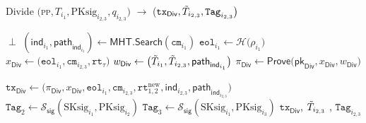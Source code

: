 \begin{algorithm}
\caption{\textsf{Divide} $\big($\textsc{pp}$, T_{i_1},  \text{PKsig}_{i_{2,3}}, q_{i_{2,3}} \big)$ $\rightarrow$ \big($\texttt{tx}_{\textsf{Div}}, \Tilde{T}_{i_{2,3}}, \texttt{Tag}_{i_{2,3}}\big)$}\label{alg:divide}
\begin{algorithmic}[1]
\State \Return $\perp$
\EndIf
\State $(\mathsf{ind}_{i_1}, \mathsf{path}_{\mathsf{ind}_{i_1}}) \gets \mathsf{MHT}.\mathsf{Search}(\texttt{cm}_{i_1})$
\State $\texttt{eol}_{i_1} \gets \mathcal{H} \big( \rho_{i_1}\big)$
\State $x_\textsf{Div} \gets \big(\texttt{eol}_{i_1}, \texttt{cm}_{i_{2,3}}, \texttt{rt}_\tau \big)$
\State $w_\textsf{Div} \gets \big( \Tilde{T}_{i_1}, \Tilde{T}_{i_{2,3}}, \mathsf{path}_{\mathsf{ind}_{i_1}}\big)$
\State $\pi_{\textsf{Div}} \gets \textsf{Prove}\big(\mathsf{pk}_{\textsf{Div}}, x_{\textsf{Div}}, w_{\textsf{Div}}\big)$

\State$\texttt{tx}_{\textsf{Div}} \gets \big(\pi_{\textsf{Div}}, x_{\textsf{Div}}, \texttt{eol}_{i_1}, \texttt{cm}_{i_{2,3}}, \texttt{rt}_{1,2}^{\text{new}}, \mathsf{ind}_{i_{2,3}}, \mathsf{path}_{\mathsf{ind}_{i_{2,3}}} \big)$
\State $\texttt{Tag}_2 \leftarrow \mathcal{S}_\mathsf{sig}(\text{SKsig}_{i_1}, \text{PKsig}_{i_2})$
\State $\texttt{Tag}_3 \leftarrow \mathcal{S}_\mathsf{sig}(\text{SKsig}_{i_1}, \text{PKsig}_{i_3})$
\State \Return $\texttt{tx}_{\textsf{Div}}$, $\Tilde{T}_{i_{2,3}}$ , $\texttt{Tag}_{i_{2,3}}$
\end{algorithmic}
\end{algorithm}


